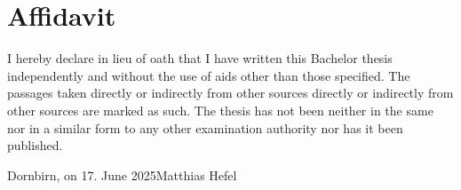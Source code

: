 \documentclass[a4paper,12pt,twoside]{scrreprt}
\begin{document}
\chapter*{Affidavit}
I hereby declare in lieu of oath that I have written this Bachelor
thesis independently and without the use of aids other than those specified.
The passages taken directly or indirectly from other sources
directly or indirectly from other sources are marked as such. The thesis has
not been
neither in the same nor in a similar form to any other examination authority
nor has it been published.

\vspace{3cm}
\noindent
Dornbirn, on 17. June 2025\hfill Matthias Hefel
\end{document}
